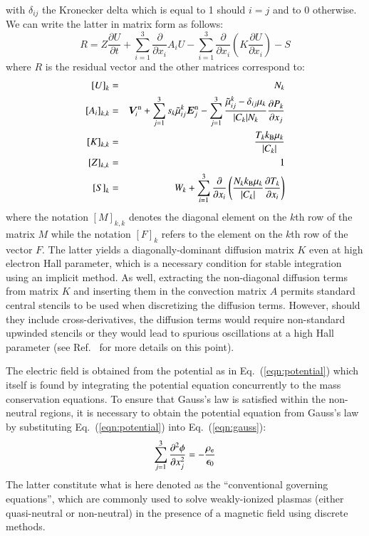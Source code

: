 \documentclass[twoside,onecolumn,10pt]{waflarticle}
\renewcommand{\vec}[1]{\bm{#1}}
\newcommand{\alb}{\vspace{0.1cm}\\} %
\newcommand{\nd}{3}
\renewcommand{\vec}[1]{\bm{ #1 }}
\begin{document}
%
with $\delta_{ij}$ the Kronecker delta which is equal to 1 should $i=j$ and to 0 otherwise. We can write the latter in matrix form as follows:
%
\begin{equation}
 R = Z \frac{\partial U}{\partial t} + \sum_{i=1}^3 \frac{\partial}{\partial x_i} A_i U  - \sum_{i=1}^3  \frac{\partial}{\partial x_i}  \left( K \frac{\partial U}{\partial x_i}\right)  -S
\end{equation}
%
where $R$ is the residual vector and the other matrices correspond to:
%
\begin{eqnarray}
 \left[U\right]_k&=&N_k \alb
 \left[A_i\right]_{k,k} &=& \vec{V}^{\rm n}_i+\sum_{j=1}^\nd s_k \wtilde{\mu}^k_{ij}  \vec{E}_j^{\rm n}
             - \sum_{j=1}^\nd  \frac{\wtilde{\mu}^{k}_{ij}-\delta_{ij} \mu_k}{|C_k| N_k} \frac{\partial P_k}{\partial x_j}  \alb
 \left[K\right]_{k,k} &=& \frac{T_k k_{\rm B} \mu_k}{|C_k|} \alb
 \left[Z\right]_{k,k} &=& 1 \alb
 \left[S\right]_k &=&W_k+
\sum_{i=1}^3 \frac{\partial}{\partial x_i} \left(\frac{N_k k_{\rm B} \mu_k}{|C_k| } \frac{\partial T_k}{\partial x_i}
\right) 
\end{eqnarray}
%
where the notation $[M]_{k,k}$ denotes the diagonal element on the $k$th row of the matrix $M$ while the notation $[F]_k$ refers to the element on the $k$th row of the vector $F$. The latter yields a diagonally-dominant diffusion matrix $K$ even at high electron Hall parameter, which is a necessary condition for stable integration using an implicit method. As well, extracting the non-diagonal diffusion terms from matrix $K$ and inserting them in the convection matrix $A$ permits standard central stencils to be used when discretizing the diffusion terms. However, should they include cross-derivatives, the diffusion terms would require non-standard upwinded stencils or they would lead to spurious oscillations at a high Hall parameter (see Ref.\ \cite{jcp:2011:parent} for more details on this point).   

The electric field is obtained from the potential as in Eq.\ (\ref{eqn:potential}) which itself is found by integrating the potential equation concurrently to the mass conservation equations. To ensure that Gauss's law is satisfied within the non-neutral regions, it is necessary to obtain the potential equation from Gauss's law by substituting Eq.\ (\ref{eqn:potential}) into Eq.\ (\ref{eqn:gauss}):
%
\begin{equation}
\sum_{j=1}^3 \frac{\partial^2 \phi}{\partial x_j^2}=-\frac{\rho_{\rm e}}{\epsilon_0}  
\label{eqn:potentialgauss}
\end{equation}
%  
The latter constitute what is here denoted as the ``conventional governing equations'', which are commonly used to solve weakly-ionized plasmas (either quasi-neutral or non-neutral) in the presence of a magnetic field using discrete methods.
\end{document}
